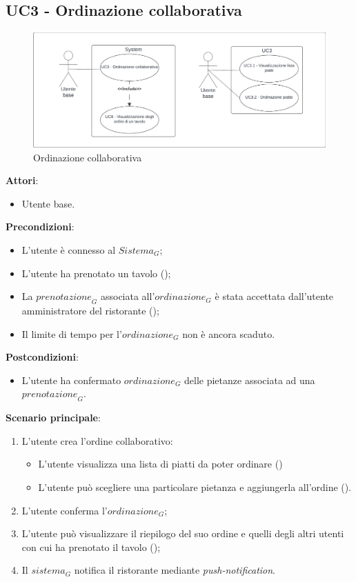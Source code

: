 \subsection{UC3 - Ordinazione collaborativa}\label{usecase:3}

\begin{figure}[H]
    \centering
    \includegraphics[width=0.9\linewidth]{ucd/UCD3_approfondito.png}
    \caption{Ordinazione collaborativa}
\end{figure}

\textbf{Attori}:
\begin{itemize}
    \item Utente base.
\end{itemize}
\textbf{Precondizioni}:
\begin{itemize}
    \item L'utente è connesso al $\textit{Sistema}_G$; 
    \item L'utente ha prenotato un tavolo ();
    \item La $\textit{prenotazione}_G$ associata all'$\textit{ordinazione}_G$ è stata accettata dall'utente amministratore del ristorante ();
    \item Il limite di tempo per l'$\textit{ordinazione}_G$ non è ancora scaduto.
\end{itemize}
\textbf{Postcondizioni}:
\begin{itemize}
    \item L'utente ha confermato $\textit{ordinazione}_G$ delle pietanze associata ad una $\textit{prenotazione}_G$.
\end{itemize}
\textbf{Scenario principale}:
\begin{enumerate}
    \item L'utente crea l'ordine collaborativo:
    \begin{itemize}
    \item L'utente visualizza una lista di piatti da poter ordinare ()
    \item L'utente può scegliere una particolare pietanza e aggiungerla all'ordine ().
    \end{itemize}
    \item L'utente conferma l'$\textit{ordinazione}_G$;
    \item L'utente può visualizzare il riepilogo del suo ordine e quelli degli altri utenti con cui ha prenotato il tavolo ();
    \item Il $\textit{sistema}_G$ notifica il ristorante mediante \textit{push-notification}.
\end{enumerate}

